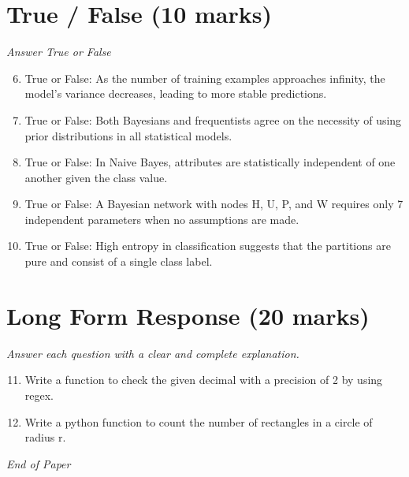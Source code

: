 \documentclass[12pt]{article}
\begin{document}
\section*{True / False (10 marks)}
\textit{Answer True or False}
\begin{enumerate}[label=\arabic*.]
\setcounter{enumi}{5}
\item True or False: As the number of training examples approaches infinity, the model's variance decreases, leading to more stable predictions.
\item True or False: Both Bayesians and frequentists agree on the necessity of using prior distributions in all statistical models.
\item True or False: In Naive Bayes, attributes are statistically independent of one another given the class value.
\item True or False: A Bayesian network with nodes H, U, P, and W requires only 7 independent parameters when no assumptions are made.
\item True or False: High entropy in classification suggests that the partitions are pure and consist of a single class label.
\end{enumerate}

\section*{Long Form Response (20 marks)}
\textit{Answer each question with a clear and complete explanation.}
\begin{enumerate}[label=\arabic*.]
\setcounter{enumi}{10}
\item Write a function to check the given decimal with a precision of 2 by using regex.
\item Write a python function to count the number of rectangles in a circle of radius r.
\end{enumerate}

\vfill
\noindent\textit{End of Paper}
\end{document}
